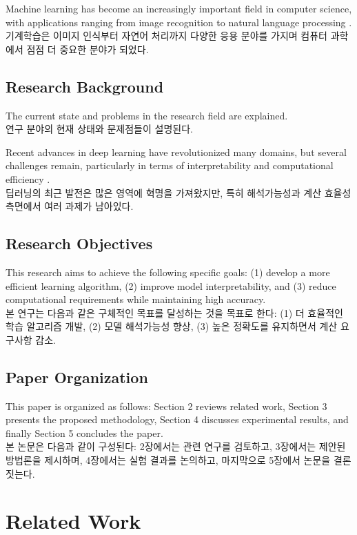 \documentclass[12pt,a4paper]{article}
\begin{document}
Machine learning has become an increasingly important field in computer science, with applications ranging from image recognition to natural language processing \cite{bishop2006pattern}. \\
기계학습은 이미지 인식부터 자연어 처리까지 다양한 응용 분야를 가지며 컴퓨터 과학에서 점점 더 중요한 분야가 되었다.

\subsection{Research Background}
The current state and problems in the research field are explained. \\
연구 분야의 현재 상태와 문제점들이 설명된다.

Recent advances in deep learning have revolutionized many domains, but several challenges remain, particularly in terms of interpretability and computational efficiency \cite{hinton2006fast}. \\
딥러닝의 최근 발전은 많은 영역에 혁명을 가져왔지만, 특히 해석가능성과 계산 효율성 측면에서 여러 과제가 남아있다.

\subsection{Research Objectives}
This research aims to achieve the following specific goals: (1) develop a more efficient learning algorithm, (2) improve model interpretability, and (3) reduce computational requirements while maintaining high accuracy. \\
본 연구는 다음과 같은 구체적인 목표를 달성하는 것을 목표로 한다: (1) 더 효율적인 학습 알고리즘 개발, (2) 모델 해석가능성 향상, (3) 높은 정확도를 유지하면서 계산 요구사항 감소.

\subsection{Paper Organization}
This paper is organized as follows: Section 2 reviews related work, Section 3 presents the proposed methodology, Section 4 discusses experimental results, and finally Section 5 concludes the paper. \\
본 논문은 다음과 같이 구성된다: 2장에서는 관련 연구를 검토하고, 3장에서는 제안된 방법론을 제시하며, 4장에서는 실험 결과를 논의하고, 마지막으로 5장에서 논문을 결론짓는다.

\section{Related Work}
\label{sec:related_work}
\end{document}
